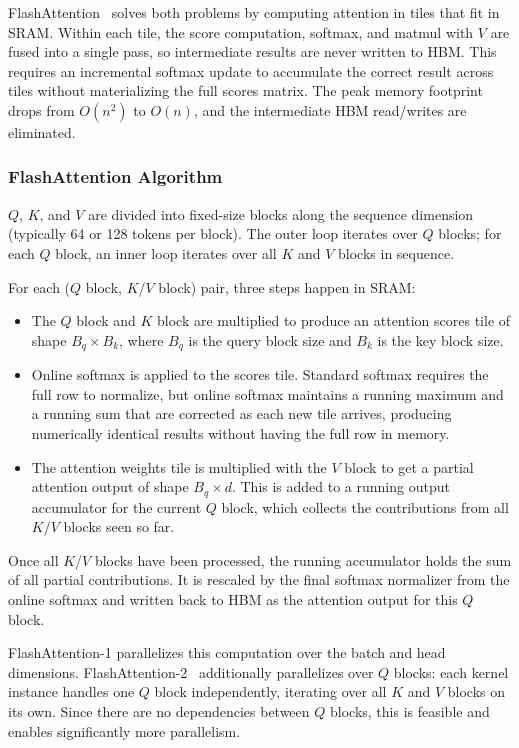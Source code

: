 FlashAttention~\cite{dao2022flashattention} solves both problems by computing attention in tiles that fit in SRAM. Within each tile, the score computation, softmax, and matmul with $V$ are fused into a single pass, so intermediate results are never written to HBM. This requires an incremental softmax update to accumulate the correct result across tiles without materializing the full scores matrix. The peak memory footprint drops from $O(n^2)$ to $O(n)$, and the intermediate HBM read/writes are eliminated.

\subsubsection{FlashAttention Algorithm}
\label{sec:flashattention_algorithm}

$Q$, $K$, and $V$ are divided into fixed-size blocks along the sequence dimension (typically 64 or 128 tokens per block). The outer loop iterates over $Q$ blocks; for each $Q$ block, an inner loop iterates over all $K$ and $V$ blocks in sequence.

For each ($Q$ block, $K$/$V$ block) pair, three steps happen in SRAM:

\begin{itemize}
    \item The $Q$ block and $K$ block are multiplied to produce an attention scores tile of shape $B_q \times B_k$, where $B_q$ is the query block size and $B_k$ is the key block size.
    \item Online softmax is applied to the scores tile. Standard softmax requires the full row to normalize, but online softmax maintains a running maximum and a running sum that are corrected as each new tile arrives, producing numerically identical results without having the full row in memory.
    \item The attention weights tile is multiplied with the $V$ block to get a partial attention output of shape $B_q \times d$. This is added to a running output accumulator for the current $Q$ block, which collects the contributions from all $K$/$V$ blocks seen so far.
\end{itemize}

Once all $K$/$V$ blocks have been processed, the running accumulator holds the sum of all partial contributions. It is rescaled by the final softmax normalizer from the online softmax and written back to HBM as the attention output for this $Q$ block.

FlashAttention-1 parallelizes this computation over the batch and head dimensions. FlashAttention-2~\cite{dao2023flashattention2} additionally parallelizes over $Q$ blocks: each kernel instance handles one $Q$ block independently, iterating over all $K$ and $V$ blocks on its own. Since there are no dependencies between $Q$ blocks, this is feasible and enables significantly more parallelism.

